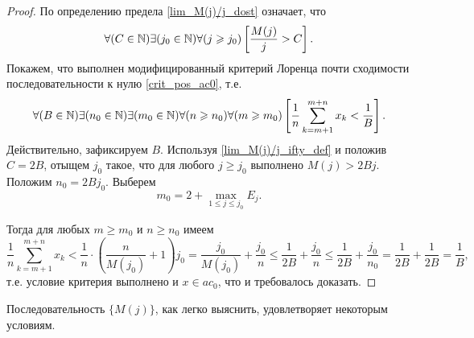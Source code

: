 \begin{proof}
	По определению предела \eqref{lim_M(j)/j_dost} означает, что
	\begin{equation}\label{lim_M(j)/j_ifty_def}
		\forall(C  \in\N)
		\exists(j_0\in\N)
		\forall(j \geq j_0)
		\left[
			\frac{M(j)}{j}>C
		\right]
		.
	\end{equation}
	Покажем, что выполнен модифицированный критерий Лоренца почти сходимости последовательности к нулю
	\eqref{crit_pos_ac0}, т.е.
	\begin{equation}
		\forall(B  \in\N)
		\exists(n_0\in\N)
		\exists(m_0\in\N)
		\forall(n\geq n_0)
		\forall(m\geq m_0)
		\\
		\left[
			\frac{1}{n}
			\sum_{k=m+1}^{m+n} x_k
			<
			\frac{1}{B}
		\right]
		.
	\end{equation} Действительно, зафиксируем $B$.
	Используя \eqref{lim_M(j)/j_ifty_def} и положив $C=2B$,
	отыщем $j_0$ такое, что для любого $j\geq j_0$ выполнено
	$M(j)>2Bj$.
	Положим $n_0 = 2Bj_0$.
	Выберем
	$$
		m_0 = 2+\max_{1\leq j \leq j_0} E_j
		.
	$$

	Тогда для любых $m\geq m_0$ и $n\geq n_0$ имеем
	\begin{equation}
		\frac{1}{n} \sum_{k=m+1}^{m+n} x_k
		<
		\frac{1}{n} \cdot \left( \frac{n}{M(j_0)} + 1 \right) j_0
		=
		\frac{j_0}{M(j_0)} + \frac{j_0}{n}
		\leq
		\frac{1}{2B} + \frac{j_0}{n}
		\leq
		\frac{1}{2B} + \frac{j_0}{n_0}
		=
		\frac{1}{2B} + \frac{1}{2B}
		=
		\frac{1}{B}
		,
	\end{equation}
	т.е. условие критерия выполнено
	и $x\in ac_0$,
	что и требовалось доказать.
\end{proof}

Последовательность $\{M(j)\}$, как легко выяснить, удовлетворяет некоторым условиям.
